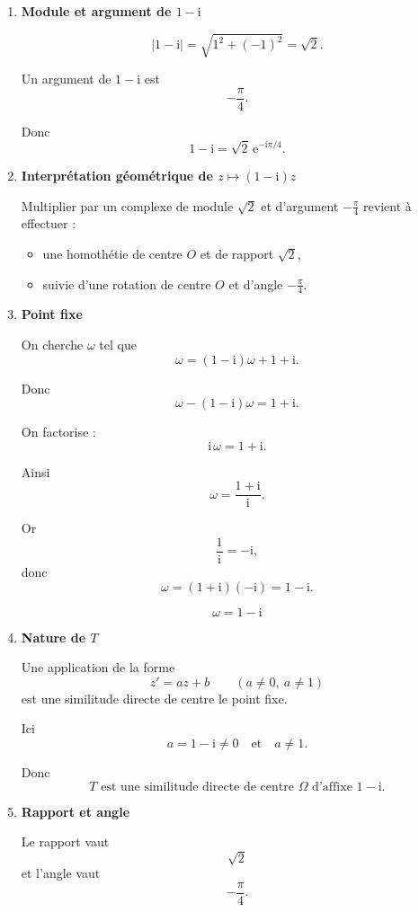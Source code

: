 \documentclass[11pt,a4paper]{article}
\newcommand{\e}{\mathrm{e}}
\newcommand{\ii}{\mathrm{i}}
\begin{document}
\begin{enumerate}[label=\textbf{3.\arabic*}, resume, leftmargin=1.6em]

\item \textbf{Module et argument de \(1-\ii\)}

\[
|1-\ii|=\sqrt{1^2+(-1)^2}=\sqrt2.
\]

Un argument de \(1-\ii\) est
\[
-\frac{\pi}{4}.
\]

Donc
\[
\boxed{1-\ii=\sqrt2\,\e^{-\ii\pi/4}.}
\]

\item \textbf{Interprétation géométrique de \(z\mapsto (1-\ii)z\)}

Multiplier par un complexe de module \(\sqrt2\) et d’argument \(-\frac{\pi}{4}\) revient à effectuer :
\begin{itemize}
    \item une homothétie de centre \(O\) et de rapport \(\sqrt2\),
    \item suivie d’une rotation de centre \(O\) et d’angle \(-\frac{\pi}{4}\).
\end{itemize}

\item \textbf{Point fixe}

On cherche \(\omega\) tel que
\[
\omega=(1-\ii)\omega+1+\ii.
\]

Donc
\[
\omega-(1-\ii)\omega=1+\ii.
\]

On factorise :
\[
\ii\,\omega=1+\ii.
\]

Ainsi
\[
\omega=\frac{1+\ii}{\ii}.
\]

Or
\[
\frac1{\ii}=-\ii,
\]
donc
\[
\omega=(1+\ii)(-\ii)=1-\ii.
\]

\[
\boxed{\omega=1-\ii}
\]

\item \textbf{Nature de \(T\)}

Une application de la forme
\[
z'=az+b
\qquad (a\neq 0,\ a\neq 1)
\]
est une similitude directe de centre le point fixe.

Ici
\[
a=1-\ii \neq 0 \quad \text{et} \quad a\neq 1.
\]

Donc
\[
\boxed{T \text{ est une similitude directe de centre } \Omega \text{ d’affixe } 1-\ii.}
\]

\item \textbf{Rapport et angle}

Le rapport vaut
\[
\boxed{\sqrt2}
\]
et l’angle vaut
\[
\boxed{-\frac{\pi}{4}}.
\]

\end{enumerate}
\end{document}
